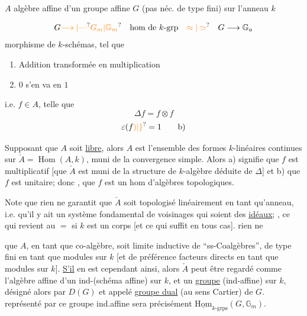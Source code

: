 $A$ algèbre affine d'un groupe affine $G$ (pas néc. de type fini) sur l'anneau $k$

\[G\unsure{\longrightarrow|\text{---}}\unsure{G_m|\mathbb G_m}\quad\text{hom de $k$-grp}\quad\unsure{\approx|\simeq}\quad G\longrightarrow\mathbb G_a\]
morphisme de $k$-schémas, tel que
\begin{enumerate}[label=(\roman*)]
\item Addition transformée en multiplication
\item $0$ s'en va en $1$
\end{enumerate}

i.e. $f\in A$, telle que
\[\Delta f=f\otimes f\tag*{a)}\]
\[\varepsilon(f\unsure{)|\}}=1\tag*{b)}\]

Supposant que $A$ soit \uline{libre}, alors $A$ est l'ensemble des formes $k$-linéaires continues sur $\check A=\operatorname{Hom}(A,k)$, muni de la convergence simple. Alors a) signifie que $f$ est multiplicatif  [que $\check A$ est muni de la structure de $k$-algèbre déduite de $\Delta$] et b) que $f$ est unitaire; donc , que $f$ est un hom d'algèbres topologiques.

 Note que rien ne garantit que $\check A$ soit topologisé linéairement en tant qu'anneau, i.e. qu'il y ait un système fondamental de voisinages qui soient des \uline{idéaux}; , ce qui revient au $=$ si $k$ est un corps [et ce qui suffit en tous cas]. rien ne

 que $A$, en tant que co-algèbre, soit limite inductive de ``ss-Coalgèbres'', de type fini en tant que modules sur $k$   [et de préférence facteurs directs en tant que modules sur $k$]. \uline{S'il} en est cependant ainsi, alors $\check A$ peut être regardé comme l'algèbre affine d'un ind-(schéma affine) sur $k$,   et  \unsure{=} un \uline{groupe} (ind-affine) sur $k$, désigné alors par $D(G)$ et appelé \uline{groupe dual} (au sens Cartier) de $G$.   représenté par ce  groupe ind.affine sera précisément $\underline{\mathrm{Hom}}_{k\text{-grps}}(G,\mathbb G_m)$.

